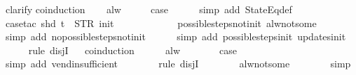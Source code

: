 \begin{isabellebody}
\ clarify\isanewline
{}\isamarkupfalse%
{\isacharparenleft}coinduction{\isacharparenright}\isanewline
\ \ \isamarkupfalse%
\ alw\isanewline
\ \ \isamarkupfalse%
\ \isamarkupfalse%
\ {\isacharquery}case\isanewline
\ \ \ \ \isamarkupfalse%
\ {\isacharparenleft}simp\ add{\isacharcolon}\ StateEq{\isacharunderscore}def{\isacharparenright}\isanewline
\ \ \ \ \isamarkupfalse%
\ {\isacharparenleft}case{\isacharunderscore}tac\ {\isachardoublequoteopen}shd\ t\ {\isacharequal}\ {\isacharparenleft}STR\ {\isacharprime}{\isacharprime}init{\isacharprime}{\isacharprime}{\isacharcomma}\ {\isacharbrackleft}{\isacharbrackright}{\isacharparenright}{\isachardoublequoteclose}{\isacharparenright}\isanewline
\ \ \ \ \ \isamarkupfalse%
\isanewline
\ \ \ \ \isamarkupfalse%
\ possible{\isacharunderscore}steps{\isacharunderscore}not{\isacharunderscore}init\ alw{\isacharunderscore}not{\isacharunderscore}some\isanewline
\ \ \ \ \ \isamarkupfalse%
\ {\isacharparenleft}simp\ add{\isacharcolon}\ no{\isacharunderscore}possible{\isacharunderscore}steps{\isacharunderscore}not{\isacharunderscore}init{\isacharparenright}\isanewline
\ \ \ \ \isamarkupfalse%
\ {\isacharparenleft}simp\ add{\isacharcolon}\ possible{\isacharunderscore}steps{\isacharunderscore}init\ updates{\isacharunderscore}init{\isacharparenright}\isanewline
\ \ \ \ \isamarkupfalse%
\ {\isacharparenleft}rule\ disjI{}{\isacharparenright}\isanewline
\ \ \isamarkupfalse%
{\isacharparenleft}coinduction{\isacharparenright}\isanewline
\ \ \ \ \isamarkupfalse%
\ alw\isanewline
\ \ \ \ \isamarkupfalse%
\ \isamarkupfalse%
\ {\isacharquery}case\isanewline
\ \ \ \ \ \ \isamarkupfalse%
\ {\isacharparenleft}simp\ add{\isacharcolon}\ vend{\isacharunderscore}insufficient{\isacharparenright}\isanewline
\ \ \ \ \ \ \isamarkupfalse%
\ {\isacharparenleft}rule\ disjI{}{\isacharparenright}\isanewline
\ \ \ \ \ \ \isamarkupfalse%
\ alw{\isacharunderscore}not{\isacharunderscore}some\isanewline
\ \ \ \ \ \ \isamarkupfalse%
\ simp\isanewline
\ \ \isamarkupfalse%
\isanewline
{}\isamarkupfalse%
%
\endisatagproof
{\isafoldproof}%
%
\isadelimproof
%
\endisadelimproof
%
\end{isabellebody}
